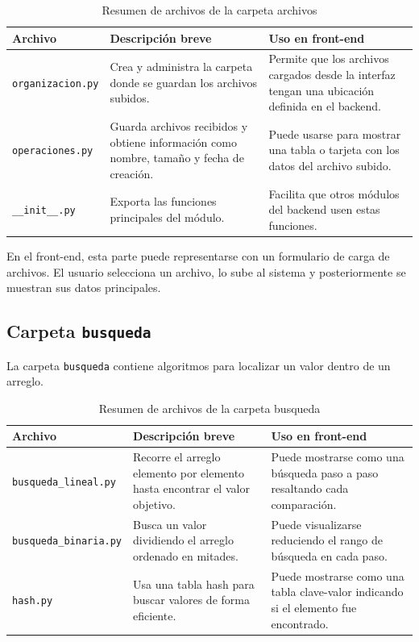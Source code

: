 \documentclass[12pt]{article}
\begin{document}
	\begin{table}[H]
		\centering
		\begin{tabular}{|p{4cm}|p{5cm}|p{5cm}|}
			\hline
			\textbf{Archivo} & \textbf{Descripción breve} & \textbf{Uso en front-end} \\
			\hline
			\texttt{organizacion.py} & Crea y administra la carpeta donde se guardan los archivos subidos. & Permite que los archivos cargados desde la interfaz tengan una ubicación definida en el backend. \\
			\hline
			\texttt{operaciones.py} & Guarda archivos recibidos y obtiene información como nombre, tamaño y fecha de creación. & Puede usarse para mostrar una tabla o tarjeta con los datos del archivo subido. \\
			\hline
			\texttt{\_\_init\_\_.py} & Exporta las funciones principales del módulo. & Facilita que otros módulos del backend usen estas funciones. \\
			\hline
		\end{tabular}
		\caption{Resumen de archivos de la carpeta archivos}
	\end{table}
	
	En el front-end, esta parte puede representarse con un formulario de carga de archivos. El usuario selecciona un archivo, lo sube al sistema y posteriormente se muestran sus datos principales.
	
	\subsection{Carpeta \texttt{busqueda}}
	
	La carpeta \texttt{busqueda} contiene algoritmos para localizar un valor dentro de un arreglo.
	
	\begin{table}[H]
		\centering
		\begin{tabular}{|p{4cm}|p{5cm}|p{5cm}|}
			\hline
			\textbf{Archivo} & \textbf{Descripción breve} & \textbf{Uso en front-end} \\
			\hline
			\texttt{busqueda\_lineal.py} & Recorre el arreglo elemento por elemento hasta encontrar el valor objetivo. & Puede mostrarse como una búsqueda paso a paso resaltando cada comparación. \\
			\hline
			\texttt{busqueda\_binaria.py} & Busca un valor dividiendo el arreglo ordenado en mitades. & Puede visualizarse reduciendo el rango de búsqueda en cada paso. \\
			\hline
			\texttt{hash.py} & Usa una tabla hash para buscar valores de forma eficiente. & Puede mostrarse como una tabla clave-valor indicando si el elemento fue encontrado. \\
			\hline
		\end{tabular}
		\caption{Resumen de archivos de la carpeta busqueda}
	\end{table}
	
\end{document}
